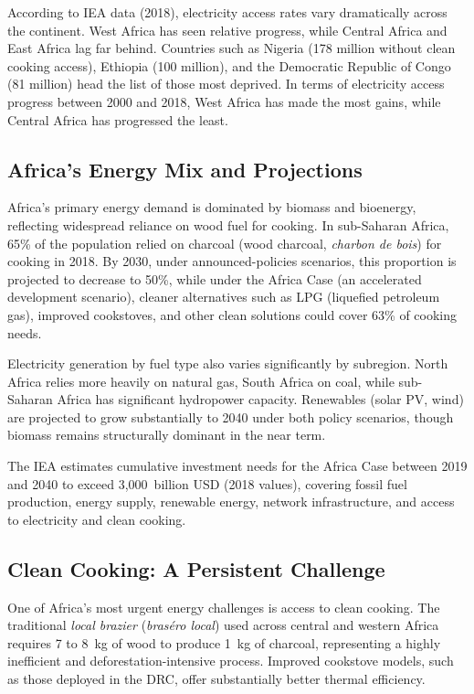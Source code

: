 According to IEA data (2018), electricity access rates vary dramatically across the continent. West Africa has seen relative progress, while Central Africa and East Africa lag far behind. Countries such as Nigeria (178 million without clean cooking access), Ethiopia (100 million), and the Democratic Republic of Congo (81 million) head the list of those most deprived. In terms of electricity access progress between 2000 and 2018, West Africa has made the most gains, while Central Africa has progressed the least.

\subsection{Africa's Energy Mix and Projections}

Africa's primary energy demand is dominated by biomass and bioenergy, reflecting widespread reliance on wood fuel for cooking. In sub-Saharan Africa, 65\% of the population relied on charcoal (wood charcoal, \textit{charbon de bois}) for cooking in 2018. By 2030, under announced-policies scenarios, this proportion is projected to decrease to 50\%, while under the Africa Case (an accelerated development scenario), cleaner alternatives such as LPG (liquefied petroleum gas), improved cookstoves, and other clean solutions could cover 63\% of cooking needs.

Electricity generation by fuel type also varies significantly by subregion. North Africa relies more heavily on natural gas, South Africa on coal, while sub-Saharan Africa has significant hydropower capacity. Renewables (solar PV, wind) are projected to grow substantially to 2040 under both policy scenarios, though biomass remains structurally dominant in the near term.

The IEA estimates cumulative investment needs for the Africa Case between 2019 and 2040 to exceed 3{,}000~billion USD (2018 values), covering fossil fuel production, energy supply, renewable energy, network infrastructure, and access to electricity and clean cooking.

\subsection{Clean Cooking: A Persistent Challenge}

One of Africa's most urgent energy challenges is access to clean cooking. The traditional \textit{local brazier} (\textit{braséro local}) used across central and western Africa requires 7 to 8~kg of wood to produce 1~kg of charcoal, representing a highly inefficient and deforestation-intensive process. Improved cookstove models, such as those deployed in the DRC, offer substantially better thermal efficiency.

